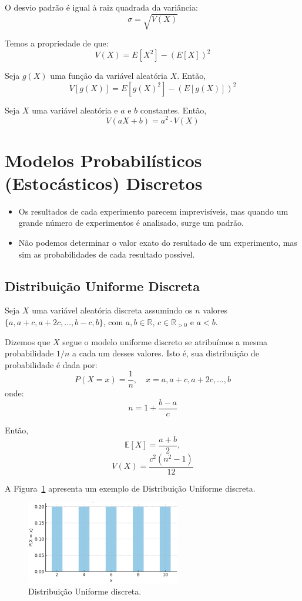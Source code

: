 \documentclass{article}
\begin{document}
O desvio padrão é igual à raiz quadrada da variância:
    $$
    \sigma = \sqrt{V(X)}
    $$

Temos a propriedade de que:
    $$
    V(X) = E[X^2] - (E[X])^2
    $$

Seja $g(X)$ uma função da variável aleatória $X$. Então,
    $$
    V[g(X)] = E[g(X)^2] - \left(E[g(X)]\right)^2
    $$

Seja $X$ uma variável aleatória e $a$ e $b$ constantes. Então,
    $$
    V(aX + b) = a^2 \cdot V(X)
    $$

\section{Modelos Probabilísticos (Estocásticos) Discretos}
\begin{itemize}
    \item Os resultados de cada experimento parecem imprevisíveis, mas quando um grande número de experimentos é analisado, surge um padrão.
    \item Não podemos determinar o valor exato do resultado de um experimento, mas sim as probabilidades de cada resultado possível.
\end{itemize}

\subsection{Distribuição Uniforme Discreta}
Seja $X$ uma variável aleatória discreta assumindo os $n$ valores  $\{a, a + c, a + 2c, \ldots, b - c, b\}$,  com $a, b \in \mathbb{R}$, $c \in \mathbb{R}_{> 0}$ e $a < b$.

Dizemos que $X$ segue o modelo uniforme discreto se atribuímos a mesma probabilidade $1/n$ a cada um desses valores.  
Isto é, sua distribuição de probabilidade é dada por:
    $$
    P(X = x) = \frac{1}{n}, \quad x = a, a + c, a + 2c, \ldots, b
    $$
onde:
    $$
    n = 1 + \frac{b - a}{c}
    $$

Então,
    $$
    \mathbb{E}[X] = \frac{a + b}{2},
    $$
    $$
    V(X) = \frac{c^2(n^2 - 1)}{12}
    $$

A Figura~\ref{fig:dist_disc_uniforme} apresenta um exemplo de Distribuição Uniforme discreta.

\begin{figure}[H]
    \centering
    \includegraphics[width=0.6\textwidth]{figuras/dist_disc_uniforme.png}
    \caption{Distribuição Uniforme discreta.}
    \label{fig:dist_disc_uniforme}
\end{figure}
\end{document}
